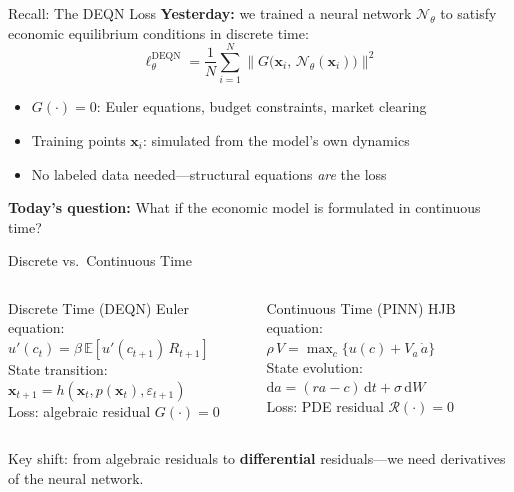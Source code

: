 \documentclass[aspectratio=169,11pt]{beamer}
\newcommand{\emphc}[1]{\textcolor{harvardcrimson}{#1}}
\newcommand{\x}{\bm{x}}
\newcommand{\E}[1]{\mathbb{E}\!\left[#1\right]}
\begin{document}
\begin{frame}{Recall: The DEQN Loss}
\textbf{Yesterday:} we trained a neural network $\mathcal{N}_\theta$ to satisfy
economic equilibrium conditions in \emphc{discrete time}:
\[
\boxed{
\ell_\theta^{\text{DEQN}} = \frac{1}{N}\sum_{i=1}^{N}
\bigl\|G\bigl(\x_i,\,\mathcal{N}_\theta(\x_i)\bigr)\bigr\|^2
}
\]

\vspace{0.3em}
\begin{itemize}
    \item $G(\cdot) = 0$: Euler equations, budget constraints, market clearing
    \item Training points $\x_i$: simulated from the model's own dynamics
    \item \emphc{No labeled data needed}---structural equations \emph{are} the loss
\end{itemize}

\vspace{0.5em}
\textbf{Today's question:}
What if the economic model is formulated in \emphc{continuous time}?
\end{frame}

\begin{frame}{Discrete vs.\ Continuous Time}
\begin{columns}[T]
\begin{block}{Discrete Time (DEQN)}
\centering\small
\vspace{0.2em}
Euler equation:\\[4pt]
$u'(c_t) = \beta\,\E{u'(c_{t+1})\,R_{t+1}}$\\[8pt]
State transition:\\[4pt]
$\x_{t+1} = h(\x_t, p(\x_t), \varepsilon_{t+1})$\\[8pt]
Loss: algebraic residual $G(\cdot) = 0$
\vspace{0.2em}
\end{block}

\begin{exampleblock}{Continuous Time (PINN)}
\centering\small
\vspace{0.2em}
HJB equation:\\[4pt]
$\rho\, V = \max_c \bigl\{u(c) + V_a\,\dot{a}\bigr\}$\\[8pt]
State evolution:\\[4pt]
$\mathrm{d}a = (ra - c)\,\mathrm{d}t + \sigma\,\mathrm{d}W$\\[8pt]
Loss: PDE residual $\mathcal{R}(\cdot) = 0$
\vspace{0.2em}
\end{exampleblock}
\end{columns}

\vspace{0.6em}
\begin{center}
{\small \emphc{Key shift:} from algebraic residuals to \textbf{differential} residuals---we need \emphc{derivatives} of the neural network.}
\end{center}
\end{frame}
\end{document}
